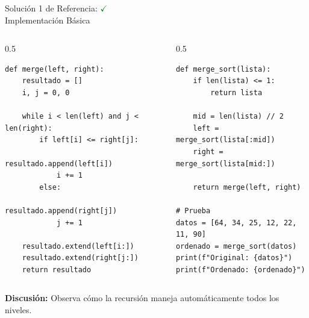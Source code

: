 \documentclass[10pt]{beamer}
\begin{document}
\begin{solutionblock}
\begin{frame}[fragile]{Solución 1 de Referencia: \hfill \textcolor{green}{$\checkmark$} \\ Implementación Básica}
\begin{columns}
\begin{column}{0.5\textwidth}
\begin{verbatim}
def merge(left, right):
    resultado = []
    i, j = 0, 0
    
    while i < len(left) and j < len(right):
        if left[i] <= right[j]:
            resultado.append(left[i])
            i += 1
        else:
            resultado.append(right[j])
            j += 1
    
    resultado.extend(left[i:])
    resultado.extend(right[j:])
    return resultado
\end{verbatim}
\end{column}
\begin{column}{0.5\textwidth}
\begin{verbatim}
def merge_sort(lista):
    if len(lista) <= 1:
        return lista
    
    mid = len(lista) // 2
    left = merge_sort(lista[:mid])
    right = merge_sort(lista[mid:])
    
    return merge(left, right)

# Prueba
datos = [64, 34, 25, 12, 22, 11, 90]
ordenado = merge_sort(datos)
print(f"Original: {datos}")
print(f"Ordenado: {ordenado}")
\end{verbatim}
\end{column}
\end{columns}
\vspace{0.3cm}
\textbf{Discusión:} Observa cómo la recursión maneja automáticamente todos los niveles.
\end{frame}
\end{solutionblock}
\end{document}
